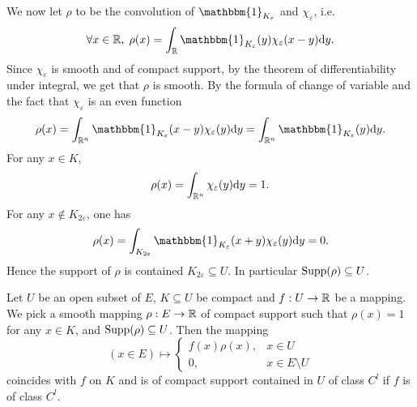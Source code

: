 \begin{proofenv}
    \quad We now let $\rho$ to be the convolution of $\mathbbm{1}_{K_{\varepsilon}}$ and $\chi_{\varepsilon}$, i.e.
    $$\forall x \in \RR,\; \rho(x) = \int_{\RR} \mathbbm{1}_{K_{\varepsilon}}(y)\chi_{\varepsilon}(x-y)\dd y.$$
    Since $\chi_{\varepsilon}$ is smooth and of compact support, by the theorem of differentiability under integral,
    we get that $\rho$ is smooth.
    By the formula of change of variable and the fact that $\chi_{\varepsilon}$ is an even function
    $$\rho(x) = \int_{\RR^n} \mathbbm{1}_{K_{\varepsilon}} (x - y)\chi_{\varepsilon} (y) \dd y = \int_{\RR^n} \mathbbm{1}_{K_{\varepsilon}}(y) \dd y.$$
    For any $x \in K$,
    $$\rho(x) = \int_{\mathbb{R}^n} \chi_{\varepsilon}(y) \mathrm{d} y = 1.$$
    For any $x \notin K_{2\varepsilon}$, one has
    $$\rho(x) = \int_{K_{2\varepsilon}} \mathbbm{1}_{K_{\varepsilon}}(x+y)\chi_{\varepsilon}(y) \dd y = 0.$$
    Hence the support of $\rho$ is contained $K_{2\varepsilon} \subseteq U$.
    In particular $\operatorname{\mathrm{Supp}}(\rho) \subseteq U$.
\end{proofenv}

\begin{remark}
    Let $U$ be an open subset of $E$, $K \subseteq U$ be compact and $f : U \rightarrow \mathbb{R}$ be a mapping.
    We pick a smooth mapping $\rho : E \rightarrow \mathbb{R}$ of compact support such that $\rho(x) = 1$ for any $x \in K$,
    and $\operatorname{\mathrm{Supp}}(\rho) \subseteq U$.
    Then the mapping
    $$(x \in E) \longmapsto \begin{cases}
        f(x) \rho(x), & x \in U\\
        0, & x \in E \setminus U
    \end{cases}$$
    coincides with $f$ on $K$ and is of compact support contained in $U$ of class $C^l$ if $f$ is of class $C^l$.
\end{remark}

